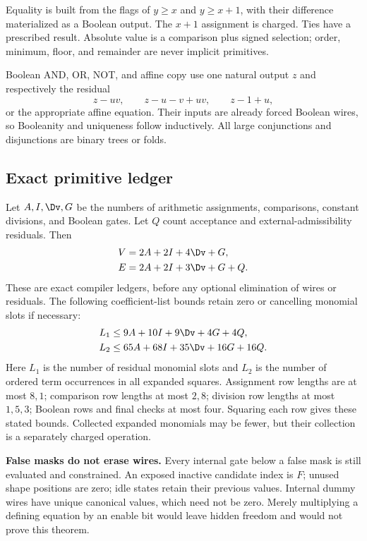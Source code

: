 \documentclass[11pt,a4paper]{article}
\numberwithin{equation}{section}
\begin{document}
Equality is built from the flags of $y\geq x$ and $y\geq x+1$, with their difference materialized as a Boolean output. The $x+1$ assignment is charged. Ties have a prescribed result. Absolute value is a comparison plus signed selection; order, minimum, floor, and remainder are never implicit primitives.

Boolean AND, OR, NOT, and affine copy use one natural output $z$ and respectively the residual
\[
z-uv,\qquad z-u-v+uv,\qquad z-1+u,
\]
or the appropriate affine equation. Their inputs are already forced Boolean wires, so Booleanity and uniqueness follow inductively. All large conjunctions and disjunctions are binary trees or folds.

\subsection{Exact primitive ledger}
Let $A,I,\Dv,G$ be the numbers of arithmetic assignments, comparisons, constant divisions, and Boolean gates. Let $Q$ count acceptance and external-admissibility residuals. Then
\begin{align}
V&=2A+2I+4\Dv+G,\label{fpa:eb:eq:V}\\
E&=2A+2I+3\Dv+G+Q.\label{fpa:eb:eq:E}
\end{align}
These are exact compiler ledgers, before any optional elimination of wires or residuals. The following coefficient-list bounds retain zero or cancelling monomial slots if necessary:
\begin{align*}
L_1&\leq9A+10I+9\Dv+4G+4Q,\\
L_2&\leq65A+68I+35\Dv+16G+16Q.
\end{align*}
Here $L_1$ is the number of residual monomial slots and $L_2$ is the number of ordered term occurrences in all expanded squares. Assignment row lengths are at most $8,1$; comparison row lengths at most $2,8$; division row lengths at most $1,5,3$; Boolean rows and final checks at most four. Squaring each row gives these stated bounds. Collected expanded monomials may be fewer, but their collection is a separately charged operation.

\textbf{False masks do not erase wires.} Every internal gate below a false mask is still evaluated and constrained. An exposed inactive candidate index is $F$; unused shape positions are zero; idle states retain their previous values. Internal dummy wires have unique canonical values, which need not be zero. Merely multiplying a defining equation by an enable bit would leave hidden freedom and would not prove this theorem.
\end{document}
